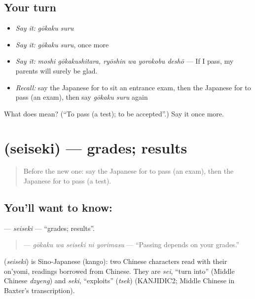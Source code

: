 \subsection*{Your turn}
\begin{itemize}
\raggedright
  \item \emph{Say it:} \emph{gōkaku suru}
  \item \emph{Say it:} \emph{gōkaku suru}, once more
  \item \emph{Say it:} \emph{moshi gōkakushitara, ryōshin wa yorokobu deshō} — If I pass, my parents will surely be glad.
  \item \emph{Recall:} say the Japanese for to sit an entrance exam, then the Japanese for to pass (an exam), then say \emph{gōkaku suru} again
\end{itemize}

\begin{tcolorbox}[breakable,colback=teal!4,colframe=teal!35!black,title={Before you move on}]
What does  mean? (\textquotedblleft{}To pass (a test); to be accepted\textquotedblright{}.) Say it once more.
\end{tcolorbox}
\section[\texorpdfstring{\ja{せいせき} (seiseki)}{せいせき (seiseki)}]{ (seiseki) — grades; results}

\label{lesson:JA-C515-seiseki}



\begin{quote}
Before the new one: say the Japanese for to pass (an exam), then the Japanese for to pass (a test).
\end{quote}

\subsection*{You'll want to know: }
\textbf{} — \emph{seiseki} — \textquotedblleft{}grades; results\textquotedblright{}.

\begin{quote}
\textbf{  } — \emph{gōkaku wa seiseki ni yorimasu} — \textquotedblleft{}Passing depends on your grades.\textquotedblright{}
\end{quote}

\begin{cousinweb}
\textbf{} (\emph{seiseki}) is Sino-Japanese (kango): two Chinese characters read with their on'yomi, readings borrowed from Chinese. They are \emph{sei}, \textquotedblleft{}turn into\textquotedblright{} (Middle Chinese \emph{dzyeng}) and \emph{seki}, \textquotedblleft{}exploits\textquotedblright{} (\emph{tsek}) (KANJIDIC2; Middle Chinese in Baxter's transcription).
\end{cousinweb}

